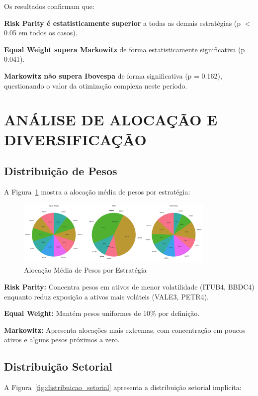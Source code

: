 Os resultados confirmam que:

\textbf{Risk Parity é estatisticamente superior} a todas as demais estratégias (p $<$ 0.05 em todos os casos).

\textbf{Equal Weight supera Markowitz} de forma estatisticamente significativa (p = 0.041).

\textbf{Markowitz não supera Ibovespa} de forma significativa (p = 0.162), questionando o valor da otimização complexa neste período.

\section{ANÁLISE DE ALOCAÇÃO E DIVERSIFICAÇÃO}

\subsection{Distribuição de Pesos}

A Figura~\ref{fig:alocacao_pesos} mostra a alocação média de pesos por estratégia:

\begin{figure}[H]
\centering
\includegraphics[width=0.85\textwidth]{figures/alocacao_pesos.png}
\caption{Alocação Média de Pesos por Estratégia}
\label{fig:alocacao_pesos}
\end{figure}

\textbf{Risk Parity:} Concentra pesos em ativos de menor volatilidade (ITUB4, BBDC4) enquanto reduz exposição a ativos mais voláteis (VALE3, PETR4).

\textbf{Equal Weight:} Mantém pesos uniformes de 10\% por definição.

\textbf{Markowitz:} Apresenta alocações mais extremas, com concentração em poucos ativos e alguns pesos próximos a zero.

\subsection{Distribuição Setorial}

A Figura~\ref{fig:distribuicao_setorial} apresenta a distribuição setorial implícita:

